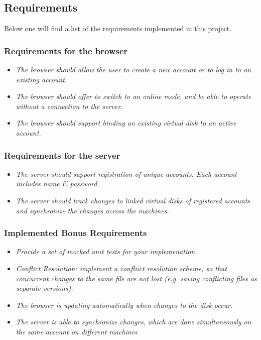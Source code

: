 \subsection{Requirements}
Below one will find a list of the requirements implemented in this project.

\subsubsection {Requirements for the browser}
\begin{itemize}
  \item \emph{The browser should allow the user to create a new account or to log in to an existing account.}
  \item \emph{The browser should offer to switch to an online mode, and be able
  to operate without a connection to the server. }
  \item \emph{The browser should support binding an existing virtual disk to an active account.}
\end{itemize}  


\subsubsection {Requirements for the server}
\begin{itemize}
  \item \emph{The server should support registration of unique accounts. Each
  account includes name \& password.}
  \item \emph{The server should track changes to linked virtual disks of registered accounts and synchronize the
changes across the machines.}
\end{itemize}  


\subsubsection {Implemented Bonus Requirements}
\begin{itemize}
  \item \emph{Provide a set of mocked unit tests for your implemenation.}

  \item \emph{Conflict Resolution: implement a confliict resolution scheme, so
  that concurrent changes to the same file are not lost (e.g. saving conflicting
  files as separate versions).}
  \item \emph{The browser is updating automatically when changes to the disk
  occur.}
  \item \emph{The server is able to synchronize changes, which are done
  simultaneously on the same account on different machines}
 
\end{itemize}

